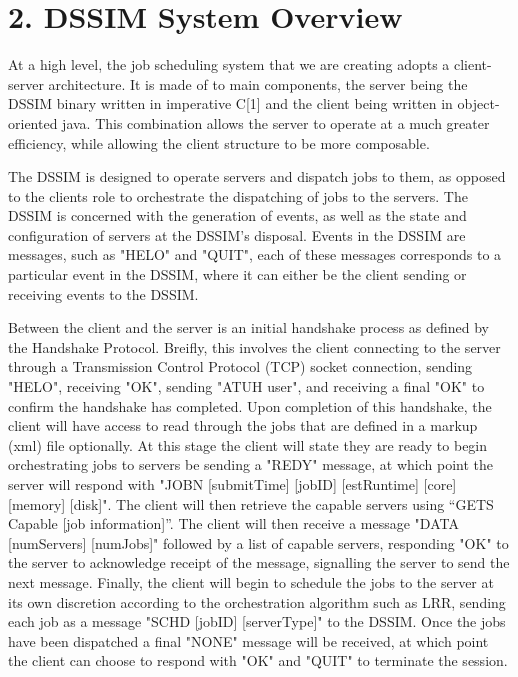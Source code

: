 \documentclass[a4paper]{article} %
\begin{document}
\section*{2. DSSIM System Overview}

At a high level, the job scheduling system that we are creating adopts a client-server architecture. It is made of to main components, the server being the DSSIM binary written in imperative C[1] and the client being written in object-oriented java. This combination allows the server to operate at a much greater efficiency, while allowing the client structure to be more composable.

The DSSIM is designed to operate servers and dispatch jobs to them, as opposed to the clients role to orchestrate the dispatching of jobs to the servers. The DSSIM is concerned with the generation of events, as well as the state and configuration of servers at the DSSIM's disposal. Events in the DSSIM are messages, such as "HELO" and "QUIT", each of these messages corresponds to a particular event in the DSSIM, where it can either be the client sending or receiving events to the DSSIM.
\newline

Between the client and the server is an initial handshake process as defined by the Handshake Protocol. Breifly, this involves the client connecting to the server through a Transmission Control Protocol (TCP) socket connection, sending "HELO", receiving "OK", sending "ATUH user", and receiving a final "OK" to confirm the handshake has completed. Upon completion of this handshake, the client will have access to read through the jobs that are defined in a markup (xml) file optionally. 
\newline
At this stage the client will state they are ready to begin orchestrating jobs to servers be sending a "REDY" message, at which point the server will respond with "JOBN [submitTime] [jobID] [estRuntime] [core] [memory] [disk]". The client will then retrieve the capable servers using  “GETS Capable [job information]”. The client will then receive a message "DATA [numServers] [numJobs]" followed by a list of capable servers, responding "OK" to the server to acknowledge receipt of the message, signalling the server to send the next message. \newline
Finally, the client will begin to schedule the jobs to the server at its own discretion according to the orchestration algorithm such as LRR, sending each job as a message "SCHD [jobID] [serverType]" to the DSSIM. Once the jobs have been dispatched a final "NONE" message will be received, at which point the client can choose to respond with "OK" and "QUIT" to terminate the session.
\newline
\end{document}
